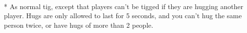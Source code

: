 \begin{minipage}{\textwidth}
\equip{}
\\*
As normal tig, except that players can't be tigged if they are hugging another player.  Hugs are only allowed to last for 5 seconds, and you can't hug the same person twice, or have hugs of more than 2 people.
\end{minipage}    \vfill
